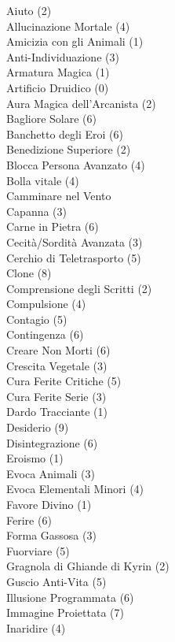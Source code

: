 \begin{multicols}{3}
{	Aiuto (2)\\
	Allucinazione Mortale (4)\\
	Amicizia con gli Animali (1)\\
	Anti-Individuazione (3)\\
	Armatura Magica (1)\\
	Artificio Druidico (0)\\
	Aura Magica dell'Arcanista (2)\\
	Bagliore Solare (6)\\
	Banchetto degli Eroi (6)\\
	Benedizione Superiore (2)\\
	Blocca Persona Avanzato (4)\\
	Bolla vitale (4)\\
	Camminare nel Vento\\
	Capanna (3)\\
	Carne in Pietra (6)\\
	Cecità/Sordità Avanzata (3)\\
	Cerchio di Teletrasporto (5)\\
	Clone (8)\\
	Comprensione degli Scritti (2)\\
	Compulsione (4)\\
	Contagio (5)\\
	Contingenza (6)\\
	Creare Non Morti (6)\\
	Crescita Vegetale (3)\\
	Cura Ferite Critiche (5)\\
	Cura Ferite Serie (3)\\
	Dardo Tracciante (1)\\
	Desiderio (9)\\
	Disintegrazione (6)\\
	Eroismo (1)\\
	Evoca Animali (3)\\
	Evoca Elementali Minori (4)\\
	Favore Divino (1)\\
	Ferire (6)\\
	Forma Gassosa (3)\\
	Fuorviare (5)\\
	Gragnola di Ghiande di Kyrin (2)\\
	Guscio Anti-Vita (5)\\
	Illusione Programmata (6)\\
	Immagine Proiettata (7)\\
	Inaridire (4)\\
}
\end{multicols}
